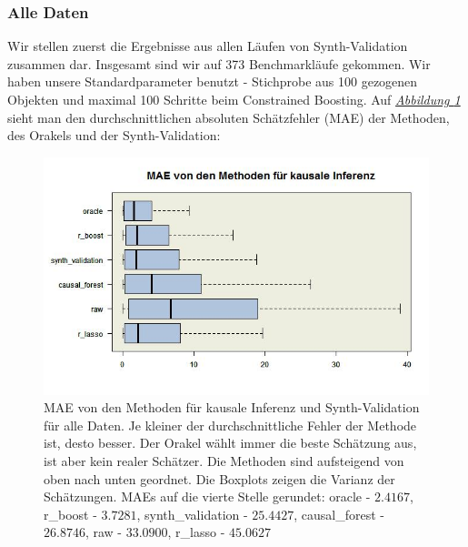\documentclass[12pt,a4paper,twoside]{scrartcl}
\numberwithin{equation}{section}
\newcommand{\reffig}[1]{\emph{\hyperref[#1]{Abbildung \ref*{#1}}}}
\begin{document}
\subsubsection{Alle Daten}\label{subsubsec:ergebnisseAlleDaten} 
Wir stellen zuerst die Ergebnisse aus allen Läufen von Synth-Validation zusammen dar. Insgesamt sind wir auf 373 Benchmarkläufe gekommen. Wir haben unsere Standardparameter benutzt - Stichprobe aus 100 gezogenen Objekten und maximal 100 Schritte beim Constrained Boosting. Auf \reffig{fig:allRunsBoxplot} sieht man den durchschnittlichen absoluten Schätzfehler (MAE) der Methoden, des Orakels und der Synth-Validation:\par

\begin{center}
\begin{figure}[h]
    \centering
    \includegraphics[height=0.5\textwidth, width=1\textwidth]{figures/plots/allRunsBoxplot.jpeg}
    \caption[MAE von den Methoden für kausale Inferenz und Synth-Validation für alle Daten]{MAE von den Methoden für kausale Inferenz und Synth-Validation für alle Daten. Je kleiner der durchschnittliche Fehler der Methode ist, desto besser. Der Orakel wählt immer die beste Schätzung aus, ist aber kein realer Schätzer. Die Methoden sind aufsteigend von oben nach unten geordnet. Die Boxplots zeigen die Varianz der Schätzungen. MAEs auf die vierte Stelle gerundet: oracle - $2.4167$, r\_boost - $3.7281$, synth\_validation - $25.4427$, causal\_forest - $26.8746$, raw - $33.0900$, r\_lasso - $45.0627$}\label{fig:allRunsBoxplot}
  \end{figure}
\end{center}
\end{document}
